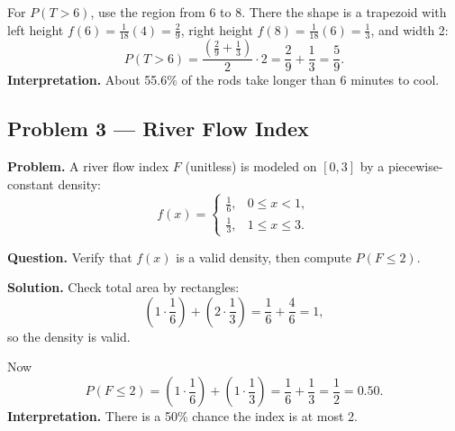 \begin{ExamProblems}
		For \(P(T>6)\), use the region from 6 to 8. There the shape is a trapezoid with
		left height \(f(6)=\frac{1}{18}(4)=\frac{2}{9}\), right height \(f(8)=\frac{1}{18}(6)=\frac{1}{3}\), and width 2:
		\[
		P(T>6)=\frac{\left(\frac{2}{9}+\frac{1}{3}\right)}{2}\cdot 2
		=\frac{2}{9}+\frac{1}{3}=\frac{5}{9}.
		\]
		\textbf{Interpretation.} About 55.6\% of the rods take longer than 6 minutes to cool.
		
		
		\hypertarget{c1-ex3}{}
		\item
		\subsection*{Problem 3 — River Flow Index}
		
		\textbf{Problem.}
		A river flow index \(F\) (unitless) is modeled on \([0,3]\) by a piecewise-constant density:
		\[
		f(x)=\begin{cases}
		\frac{1}{6}, & 0\le x<1,\\
		\frac{1}{3}, & 1\le x\le 3.
		\end{cases}
		\]
		
		\textbf{Question.} Verify that \(f(x)\) is a valid density, then compute \(P(F\le 2)\).
		
		\textbf{Solution.}
		Check total area by rectangles:
		\[
		\left(1\cdot\frac{1}{6}\right)+\left(2\cdot\frac{1}{3}\right)=\frac{1}{6}+\frac{4}{6}=1,
		\]
		so the density is valid.
		
		Now
		\[
		P(F\le 2)=\left(1\cdot\frac{1}{6}\right)+\left(1\cdot\frac{1}{3}\right)=\frac{1}{6}+\frac{1}{3}=\frac{1}{2}=0.50.
		\]
		\textbf{Interpretation.} There is a 50\% chance the index is at most 2.
		
	\end{ExamProblems}
	
	
